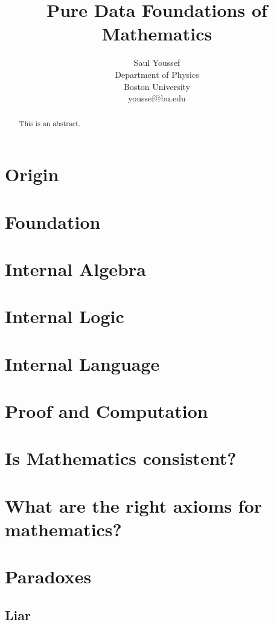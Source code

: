 \documentclass[12pt]{article}
\begin{document}
\title{Pure Data Foundations of Mathematics}
\author{%
  Saul Youssef%
  \hfil \\
  Department of Physics \\
  Boston University \\
  youssef@bu.edu\\
}
\maketitle
\begin{abstract}
This is an abstract.
\end{abstract}

\section{Origin}
\section{Foundation} 
\section{Internal Algebra}
\section{Internal Logic}
\section{Internal Language}
\section{Proof and Computation}
\section{Is Mathematics consistent?}
\section{What are the right axioms for mathematics?}
\section{Paradoxes} 
\subsection{Liar}
\end{document}
